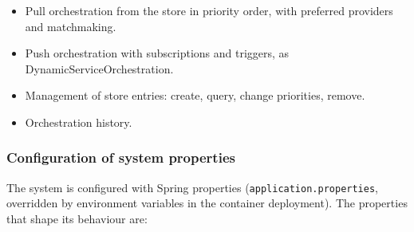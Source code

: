 \documentclass[a4paper]{arrowhead}
\begin{document}
\begin{itemize}
  \item Pull orchestration from the store in priority order, with preferred providers and matchmaking.
  \item Push orchestration with subscriptions and triggers, as Dynamic\allowbreak{}Service\allowbreak{}Orchestration.
  \item Management of store entries: create, query, change priorities, remove.
  \item Orchestration history.
\end{itemize}

\subsubsection{Configuration of system properties}

The system is configured with Spring properties (\texttt{application.properties}, overridden by environment variables in the container deployment). The properties that shape its behaviour are:
\end{document}
